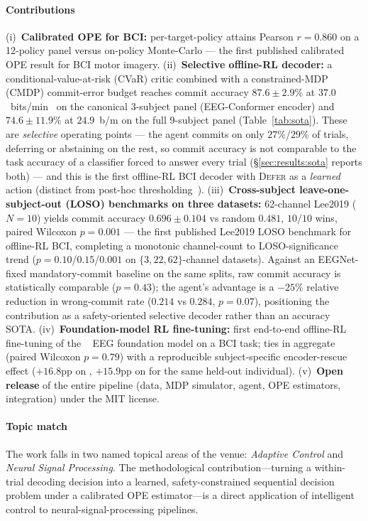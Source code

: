 \paragraph*{Contributions}
(i)~\textbf{Calibrated OPE for BCI:} per-target-policy \fqe{}
attains Pearson $r\!=\!0.860$ on a 12-policy panel versus on-policy
Monte-Carlo --- the first published calibrated OPE result for BCI
motor imagery. (ii)~\textbf{Selective offline-RL decoder:} a
conditional-value-at-risk (CVaR) critic combined with a
constrained-MDP (CMDP) commit-error budget reaches commit
accuracy $87.6\!\pm\!2.9\%$ at $37.0$~bits/min~\itr{} on the
canonical 3-subject \bcia{} panel (EEG-Conformer encoder) and
$74.6\!\pm\!11.9\%$ at $24.9$~b/m on the full 9-subject panel
(Table~\ref{tab:sota}). These are \emph{selective} operating
points --- the agent commits on only $27\%$/$29\%$ of trials,
deferring or abstaining on the rest, so commit accuracy is not
comparable to the task accuracy of a classifier forced to answer
every trial (\S\ref{sec:results:sota} reports both) --- and this
is the first offline-RL BCI decoder with \textsc{Defer} as a
\emph{learned} action (distinct from post-hoc
thresholding~\cite{Ganeshkumar2017RejectMI}).
(iii)~\textbf{Cross-subject leave-one-subject-out (LOSO)
benchmarks on three datasets:} 62-channel
Lee2019 ($N\!=\!10$) yields commit accuracy
$0.696\!\pm\!0.104$ vs random $0.481$, $10/10$ wins, paired
Wilcoxon $p\!=\!0.001$ --- the first published Lee2019 LOSO
benchmark for offline-RL BCI, completing a monotonic
channel-count to LOSO-significance trend
($p\!=\!0.10$/$0.15$/$0.001$ on $\{3, 22, 62\}$-channel datasets).
Against an EEGNet-fixed mandatory-commit baseline on the same
splits, raw commit accuracy is statistically comparable
($p\!=\!0.43$); the agent's advantage is a $-25\%$ relative
reduction in wrong-commit rate ($0.214$ vs $0.284$,
$p\!=\!0.07$), positioning the contribution as a safety-oriented
selective decoder rather than an accuracy SOTA.
(iv)~\textbf{Foundation-model RL fine-tuning:} first end-to-end
offline-RL fine-tuning of the \labram{}~\cite{LaBraM2024} EEG
foundation model on a BCI task; ties \eegnet{} in aggregate
(paired Wilcoxon $p\!=\!0.79$) with a reproducible subject-specific
encoder-rescue effect ($+16.8$pp on \bcib{}, $+15.9$pp on \bcia{}
for the same held-out individual).
(v)~\textbf{Open release} of the entire pipeline (data, MDP
simulator, agent, OPE estimators, \labram{} integration) under the
MIT license.

\paragraph*{Topic match}
The work falls in two named topical areas of the venue:
\emph{Adaptive Control} and \emph{Neural Signal Processing}. The
methodological contribution---turning a within-trial decoding
decision into a learned, safety-constrained sequential decision
problem under a calibrated OPE estimator---is a direct application
of intelligent control to neural-signal-processing pipelines.

